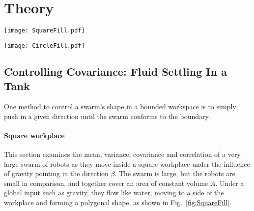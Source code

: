 \section{Theory}
\label{sec:theory}
\begin{figure*}[!htb]
\begin{center}
\texttt{[image: SquareFill.pdf]} 
\vspace{-1em}
\caption{Pushing the swarm against a square boundary wall allows limited control of the shape of the swarm, as a function of swarm area $A$ and the commanded movement direction $\beta$. Left plot shows locus of possible mean positions for five values of $A$.  The locus morphs from a square to a circle as $A$ increases.  The covariance ellipse for each $A$ is shown with a dashed line. Center shows two corresponding arrangements of kilobots.  At right is $\bar{x}(A), \sigma_{xy}(A), \sigma_x^2(A),$ and $\rho(A)$ for a range of $\beta$ values. See online interactive demonstration at [withheld for double-blind review].}
\label{fig:SquareFill}
\end{center}
\end{figure*} 
\begin{figure*}[!htb]
\begin{center}
\texttt{[image: CircleFill.pdf]} 
\vspace{-1em}
\caption{Pushing the swarm against a circular boundary wall allows limited control of the shape of the swarm, as a function of the fill level $h$ and the commanded movement direction $\beta$. Left plot shows locus of possible mean positions for four values of $h$. The locus of possible mean positions are concentric circles. See online interactive demonstration at [withheld for double-blind review].}
\label{fig:CircleFill}
\end{center}
\end{figure*} 

\subsection{Controlling Covariance: Fluid Settling In a Tank}\label{subsec:FluidInTank}
One method to control a swarm's shape in a bounded workspace is to simply push in a given direction until the swarm conforms to the boundary.
\paragraph{Square workplace}
This section examines the mean, variance,  covariance and correlation of a very large swarm of robots as they move inside a square workplace under the influence of gravity pointing in the direction $\beta$. The swarm is large, but the robots are small in comparison, and together cover an area of constant volume $A$. Under a global input such as gravity, they flow like water, moving to a side of the workplace and forming a polygonal shape, as shown in Fig.~\ref{fig:SquareFill}. 

